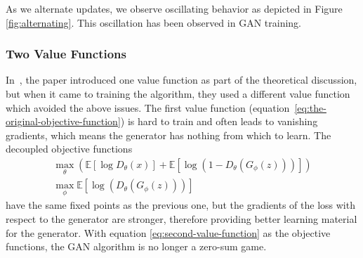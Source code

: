 As we alternate updates, we observe oscillating behavior as depicted
in Figure \ref{fig:alternating}.  This oscillation has been observed
in GAN training.

%
%
%

\subsubsection{Two Value Functions}%
\label{sec:two-value}

In~\cite{ref:goodfellow-original}, the paper introduced one value function as
part of the theoretical discussion, but when it came to training the algorithm,
they used a different value function which avoided the above issues. The first
value function (equation~\ref{eq:the-original-objective-function}) is hard to
train and often leads to vanishing gradients, which means the generator has
nothing from which to learn. The decoupled objective functions
\begin{align}
  \label{eq:second-value-function} \max_{\theta} \left(
  \mathbb{E}\left[\log{D_\theta(x)}\right] +
  \mathbb{E}\left[\log(1 - D_\theta(G_\phi(z)))\right]
  \right) \\
  \max_{\phi}\mathbb{E}\left[\log(D_\theta(G_\phi(z)))\right]
\end{align}
have the same fixed points as the previous one, but the gradients of the loss
with respect to the generator are stronger, therefore providing better learning
material for the generator. With equation \ref{eq:second-value-function} as the
objective functions, the GAN algorithm is no longer a zero-sum game.

